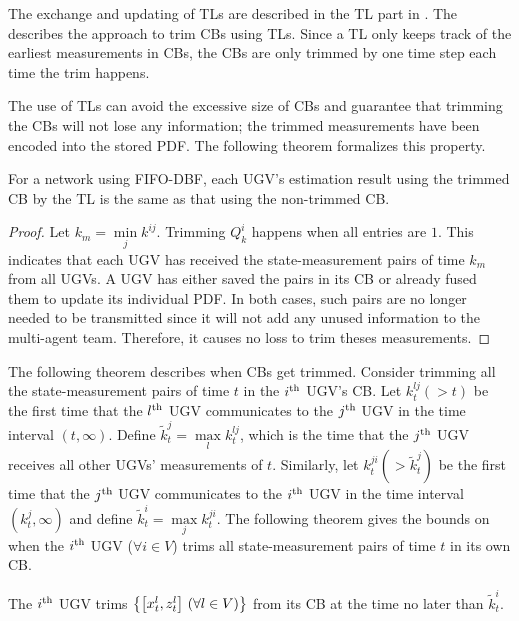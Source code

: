 	The exchange and updating of TLs are described in the TL part in .
	The  describes the approach to trim CBs using TLs.
	Since a TL only keeps track of the earliest measurements in CBs, the CBs are only trimmed by one time step each time the trim happens.
	
	The use of TLs can avoid the excessive size of CBs and guarantee that trimming the CBs will not lose any information; the trimmed measurements have been encoded into the stored PDF.
	The following theorem formalizes this property.
	
	\begin{thm}\label{thm:trim_no_loss}
		For a {\fc} network using FIFO-DBF, 
		each UGV's estimation result using the trimmed CB by the TL is the same as that using the non-trimmed CB.
	\end{thm}
	
	\begin{proof}
		
		Let $k_m=\min\limits_j k^{ij}$. 
		Trimming $Q^i_k$ happens when all entries are $1$. 
		This indicates that each UGV has received the state-measurement pairs of time $k_m$ from all UGVs.
		A UGV has either saved the pairs in its CB or already fused them to update its individual PDF.
		In both cases, such pairs are no longer needed to be transmitted since it will not add any unused information to the multi-agent team. 
		Therefore, it causes no loss to trim theses measurements.
	\end{proof}
	
	The following theorem describes when CBs get trimmed.
	Consider trimming all the state-measurement pairs of time $t$ in the $i^\text{th}$ UGV's CB.
	Let $k^{lj}_t (>t)$ be the first time that the $l^\text{th}$ UGV communicates to the $j^\text{th}$ UGV in the time interval $(t,\infty)$.
	Define $\tilde{k}^j_t=\max\limits_l k^{lj}_t$, which is the time that the $j^\text{th}$ UGV receives all other UGVs' measurements of $t$.
	Similarly, let $k^{ji}_t (> \tilde{k}^j_t)$ be the first time that the $j^\text{th}$ UGV communicates to the $i^\text{th}$ UGV in the time interval $(k^j_t,\infty)$ and define $\tilde{k}^i_t=\max\limits_j k^{ji}_t$.
	The following theorem gives the bounds on when the $i^\text{th}$ UGV ($\forall i\in V$) trims all state-measurement pairs of time $t$ in its own CB.
	\begin{thm}\label{thm:upd_tl_freq}		
		The $i^\text{th}$ UGV trims $\left\lbrace\left[x^l_t,z^l_t\right] \,(\forall l\in V)\right\rbrace$ from its CB at the time no later than $\tilde{k}^i_t$.
	\end{thm}
	
